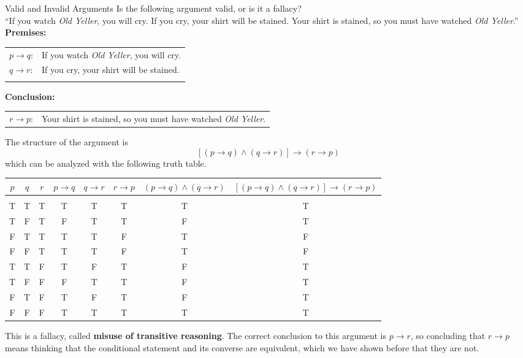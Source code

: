 \begin{example}[https://www.youtube.com/watch?v=ocJ0y5qimTY]{Valid and Invalid Arguments}
Is the following argument valid, or is it a fallacy?\\

``If you watch \textit{Old Yeller}, you will cry.  If you cry, your shirt will be stained.  Your shirt is stained, so you must have watched \textit{Old Yeller}.''\\

\textbf{Premises:}\\
\begin{tabular}{l l}
$p \to q$: & If you watch \textit{Old Yeller}, you will cry.\\
$q \to r$: & If you cry, your shirt will be stained.\\
& \\
\end{tabular}

\textbf{Conclusion:}\\
\begin{tabular}{l l}
$r \to p$: & Your shirt is stained, so you must have watched \textit{Old Yeller}.
\end{tabular}

The structure of the argument is \[[(p \to q) \wedge (q \to r)] \to (r \to p)\]
which can be analyzed with the following truth table.
\begin{center}
{\small
\begin{tabular}{|c c c c c c c c|}
\hline
$p$ & $q$ & $r$ & $p \to q$ & $q \to r$ & $r \to p$ & $(p \to q) \wedge (q \to r)$ & $[(p \to q) \wedge (q \to r)] \to (r \to p)$\\
\hline
& & & & & & & \\
T & T & T & T & T & T & T & T\\
T & F & T & F & T & T & F & T\\
F & T & T & T & T & F & T & F\\
F & F & T & T & T & F & T & F\\
T & T & F & T & F & T & F & T\\
T & F & F & F & T & T & F & T\\
F & T & F & T & F & T & F & T\\
F & F & F & T & T & T & T & T\\
\hline
\end{tabular}}
\end{center}

This is a fallacy, called \textbf{misuse of transitive reasoning}.  The correct conclusion to this argument is $p \to r$, so concluding that $r \to p$ means thinking that the conditional statement and its converse are equivalent, which we have shown before that they are not.
\end{example}

